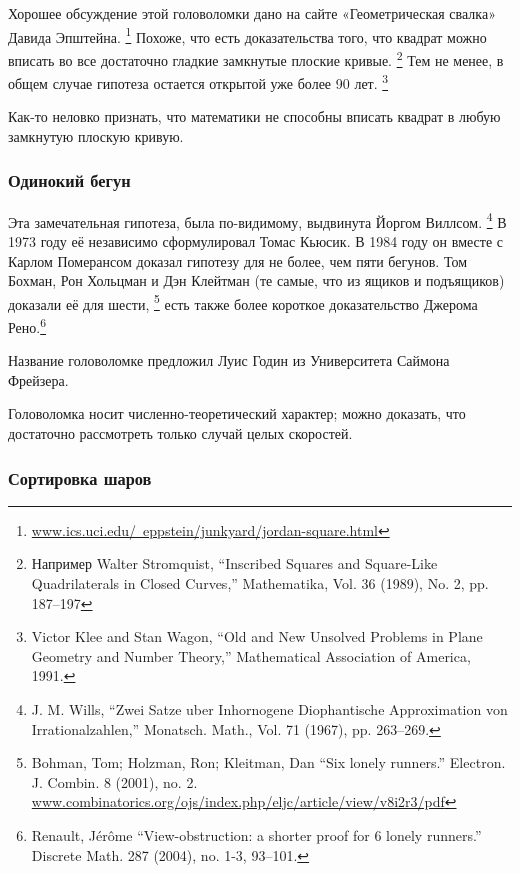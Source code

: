 Хорошее обсуждение этой головоломки дано на сайте «Геометрическая свалка» Давида Эпштейна.%
\footnote{\href{http://www.ics.uci.edu/~eppstein/junkyard/jordan-square.html}{www.ics.uci.edu/~eppstein/junkyard/jordan-square.html}}
Похоже, что есть доказательства того, что квадрат можно вписать во все достаточно гладкие замкнутые плоские кривые.%
\footnote{Например Walter Stromquist, ``Inscribed Squares and Square-Like Quadrilaterals in Closed Curves,'' Mathematika, Vol. 36 (1989), No. 2, pp. 187--197}
Тем не менее, в общем случае гипотеза остается открытой уже более 90 лет.%
\footnote{Victor Klee and Stan Wagon, ``Old and New Unsolved Problems in Plane Geometry and Number Theory,'' Mathematical Association of America, 1991.}

\medskip

Как-то неловко признать, что математики не способны вписать квадрат в любую замкнутую плоскую кривую.

\subsubsection*{Одинокий бегун}

Эта замечательная гипотеза, была по-видимому, выдвинута Йоргом Виллсом.%
\footnote{J. M. Wills, ``Zwei Satze uber Inhornogene Diophantische Approximation von Irrationalzahlen,'' Monatsch. Math., Vol. 71 (1967), pp. 263--269.}
В 1973 году её независимо сформулировал Томас Кьюсик.
В 1984 году он вместе с Карлом Померансом доказал гипотезу для не более, чем пяти бегунов.
Том Бохман, Рон Хольцман и Дэн Клейтман (те самые, что из ящиков и подъящиков) доказали её для шести,%
\footnote{Bohman, Tom; Holzman, Ron; Kleitman, Dan
``Six lonely runners.''
Electron. J. Combin. 8 (2001), no. 2.\\
\href{https://www.combinatorics.org/ojs/index.php/eljc/article/view/v8i2r3/pdf}{www.combinatorics.org/ojs/index.php/eljc/article/view/v8i2r3/pdf}}
есть также более короткое доказательство Джерома Рено.\footnote{Renault, J\'{e}r\^{o}me ``View-obstruction: a shorter proof for 6 lonely runners.'' Discrete Math. 287 (2004), no. 1-3, 93--101.}

\medskip

Название головоломке предложил Луис Годин из Университета Саймона Фрейзера. %

Головоломка носит численно-теоретический характер;
можно доказать, что достаточно рассмотреть только случай целых скоростей.

\subsubsection*{Сортировка шаров}

